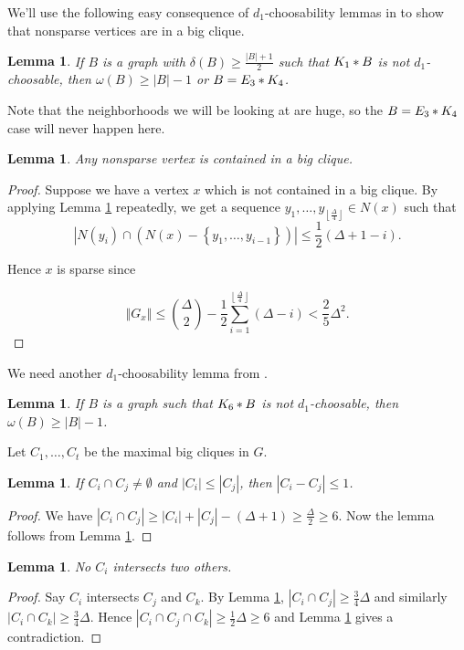 \documentclass[12pt]{amsart}
\theoremstyle{plain}
\newtheorem{lem}[thm]{Lemma}
\theoremstyle{definition}
\theoremstyle{remark}
\newcommand{\set}[1]{\left\{ #1 \right\}}
\newcommand{\card}[1]{\left|#1\right|}
\newcommand{\size}[1]{\left\Vert#1\right\Vert}
\newcommand{\floor}[1]{\left\lfloor#1\right\rfloor}
\newcommand{\join}[2]{#1 \mbox{\hspace{2 pt}$\ast$\hspace{2 pt}} #2}
\begin{document}
We'll use the following easy consequence of $d_1$-choosability lemmas in
\cite{mules} to show that nonsparse vertices are in a big clique.

\begin{lem}\label{neighborhood}
If $B$ is a graph with $\delta(B) \geq \frac{\card{B} + 1}{2}$ such that
$\join{K_1}{B}$ is not $d_1$-choosable, then $\omega(B) \geq \card{B} - 1$ or
$B = \join{E_3}{K_4}$.
\end{lem}

Note that the neighborhoods we will be looking at are huge, so the $B =
\join{E_3}{K_4}$ case will never happen here.

\begin{lem}
Any nonsparse vertex is contained in a big clique.
\end{lem}
\begin{proof}
Suppose we have a vertex $x$ which is not contained in a big clique. 
By applying Lemma \ref{neighborhood} repeatedly, we get a sequence $y_1,
\ldots, y_{\floor{\frac{\Delta}{4}}} \in N(x)$ such that 
\[\card{N(y_i) \cap (N(x) - \set{y_1, \ldots, y_{i-1}})} \leq \frac12 (\Delta +
1 - i).\]

\noindent Hence $x$ is sparse since

\[\size{G_x} \leq {\Delta \choose 2} -
\frac12\sum_{i=1}^{\floor{\frac{\Delta}{4}}} (\Delta - i) < \frac25 \Delta^2.\]
\end{proof}

We need another $d_1$-choosability lemma from \cite{mules}.

\begin{lem}\label{K6join}
If $B$ is a graph such that $\join{K_6}{B}$ is not $d_1$-choosable, then
$\omega(B) \geq \card{B} - 1$.
\end{lem}

Let $C_1, \ldots, C_t$ be the maximal big cliques in $G$.

\begin{lem}\label{MaxBig1}
If $C_i \cap C_j \neq \emptyset$ and $\card{C_i} \leq \card{C_j}$, then
$\card{C_i - C_j} \leq 1$.
\end{lem}
\begin{proof}
We have $\card{C_i \cap C_j} \geq \card{C_i} + \card{C_j} - (\Delta + 1) \geq
\frac{\Delta}{2} \geq 6$.  Now the lemma follows from Lemma \ref{K6join}. 
\end{proof}

\begin{lem}\label{MaxBig2}
No $C_i$ intersects two others.
\end{lem}
\begin{proof}
Say $C_i$ intersects $C_j$ and $C_k$.  By Lemma \ref{MaxBig1}, $\card{C_i \cap
C_j} \geq \frac34 \Delta$ and similarly $\card{C_i \cap
C_k} \geq \frac34 \Delta$.  Hence $\card{C_i \cap C_j \cap C_k} \geq \frac12
\Delta \geq 6$ and Lemma \ref{K6join} gives a contradiction.
\end{proof}
\end{document}
